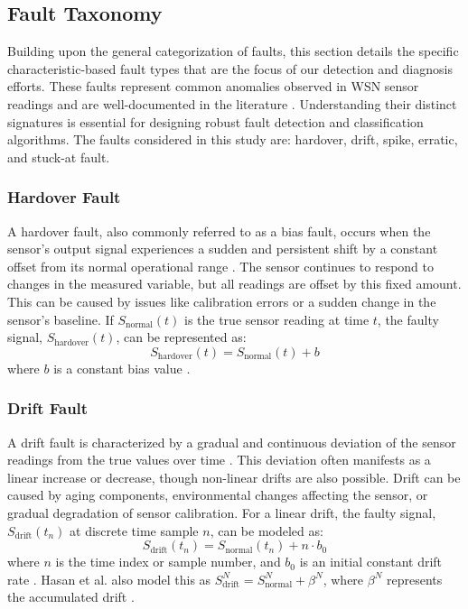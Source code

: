 \subsection{Fault Taxonomy}
\label{subsec:types}
Building upon the general categorization of faults, this section details the specific characteristic-based fault types that are the focus of our detection and diagnosis efforts. These faults represent common anomalies observed in WSN sensor readings and are well-documented in the literature \cite{Saeed2021, Hasan2024, Shi2024, Ni2009}. Understanding their distinct signatures is essential for designing robust fault detection and classification algorithms. The faults considered in this study are: hardover, drift, spike, erratic, and stuck-at fault. 

\subsubsection{Hardover Fault}
A hardover fault, also commonly referred to as a bias fault, occurs when the sensor's output signal experiences a sudden and persistent shift by a constant offset from its normal operational range \cite{Saeed2021, Shi2024, Hasan2024}. The sensor continues to respond to changes in the measured variable, but all readings are offset by this fixed amount. This can be caused by issues like calibration errors or a sudden change in the sensor's baseline. If \(S_\text{normal}(t)\) is the true sensor reading at time \(t\), the faulty signal, \(S_\text{hardover}(t)\), can be represented as:
\[S_\text{hardover}(t) = S_\text{normal}(t) + b\]
where \(b\) is a constant bias value \cite{Saeed2021}.

\subsubsection{Drift Fault}
A drift fault is characterized by a gradual and continuous deviation of the sensor readings from the true values over time \cite{Saeed2021, Hasan2024}. This deviation often manifests as a linear increase or decrease, though non-linear drifts are also possible. Drift can be caused by aging components, environmental changes affecting the sensor, or gradual degradation of sensor calibration. For a linear drift, the faulty signal, \(S_\text{drift}(t_n)\) at discrete time sample \(n\), can be modeled as:
\[S_\text{drift}(t_n) = S_\text{normal}(t_n) + n \cdot b_0\]
where \(n\) is the time index or sample number, and \(b_0\) is an initial constant drift rate \cite{Saeed2021}. Hasan et al. also model this as \(S_\text{drift}^N = S_\text{normal}^N +\beta^N\), where \(\beta^N\) represents the accumulated drift \cite{Hasan2024}.

